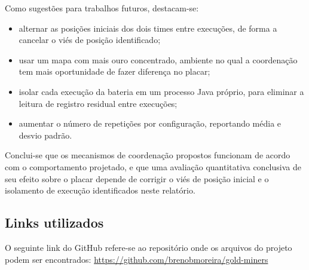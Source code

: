 \documentclass{article}
\begin{document}
Como sugestões para trabalhos futuros, destacam-se:

\begin{itemize}
    \item alternar as posições iniciais dos dois times entre execuções, de
    forma a cancelar o viés de posição identificado;
    \item usar um mapa com mais ouro concentrado, ambiente no qual a
    coordenação tem mais oportunidade de fazer diferença no placar;
    \item isolar cada execução da bateria em um processo Java próprio, para
    eliminar a leitura de registro residual entre execuções;
    \item aumentar o número de repetições por configuração, reportando média
    e desvio padrão.
\end{itemize}

Conclui-se que os mecanismos de coordenação propostos funcionam de acordo
com o comportamento projetado, e que uma avaliação quantitativa conclusiva
de seu efeito sobre o placar depende de corrigir o viés de posição inicial e
o isolamento de execução identificados neste relatório.

\subsection{Links utilizados}

O seguinte link do GitHub refere-se ao repositório onde os arquivos do
projeto podem ser encontrados:
\url{https://github.com/brenobmoreira/gold-miners}
\end{document}
